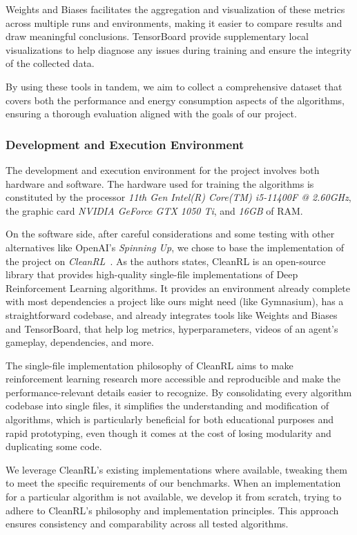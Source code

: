 Weights and Biases facilitates the aggregation and visualization of these metrics across multiple runs and environments, making it easier to compare results and draw meaningful conclusions. TensorBoard provide supplementary local visualizations to help diagnose any issues during training and ensure the integrity of the collected data.

By using these tools in tandem, we aim to collect a comprehensive dataset that covers both the performance and energy consumption aspects of the algorithms, ensuring a thorough evaluation aligned with the goals of our project.

\subsubsection{Development and Execution Environment}
\label{subsubsec:development_execution_environment}

The development and execution environment for the project involves both hardware and software. The hardware used for training the algorithms is constituted by the processor \textit{11th Gen Intel(R) Core(TM) i5-11400F @ 2.60GHz}, the graphic card \textit{NVIDIA GeForce GTX 1050 Ti}, and \textit{16GB} of RAM.

On the software side, after careful considerations and some testing with other alternatives like OpenAI's \textit{Spinning Up}, we chose to base the implementation of the project on \textit{CleanRL}~\cite{huang:cleanrl}. As the authors states, CleanRL is an open-source library that provides high-quality single-file implementations of Deep Reinforcement Learning algorithms. It provides an environment already complete with most dependencies a project like ours might need (like Gymnasium), has a straightforward codebase, and already integrates tools like Weights and Biases and TensorBoard, that help log metrics, hyperparameters, videos of an agent's gameplay, dependencies, and more.

The single-file implementation philosophy of CleanRL aims to make reinforcement learning research more accessible and reproducible and make the performance-relevant details easier to recognize. By consolidating every algorithm codebase into single files, it simplifies the understanding and modification of algorithms, which is particularly beneficial for both educational purposes and rapid prototyping, even though it comes at the cost of losing modularity and duplicating some code.

We leverage CleanRL's existing implementations where available, tweaking them to meet the specific requirements of our benchmarks. When an implementation for a particular algorithm is not available, we develop it from scratch, trying to adhere to CleanRL's philosophy and implementation principles. This approach ensures consistency and comparability across all tested algorithms.

